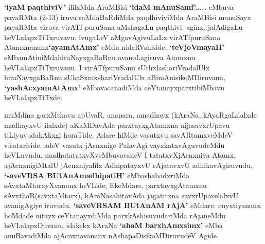 \centerline{}

\begin{artha}
\textbf{`iyaM paqthiviV'} ililxMda AraMBisi \textbf{`idaM mAnuSamf'.....} eMbuva payaRMta (2-13) iruva saMdaBaRdiMda paqdhiviyiMda AraMBisi manuSayx payaRMta viruva virATf puruSana aMshagaLu paqthivi. aginx. jalAdigaLu heVLalapxTiTxruvavu. ivugaLeV aMgavAgivuLaLx virATfpuruSana Atamxnanunx\break \textbf{`ayamAtAmx'} eMdu nideRVshiside. \textbf{`teVjoVmayaH'} eMbamAtiniMda\break hiraNayxgaBaRnu avanoLagiruva Atamxnu heVLalapxTiTxruvanu. I virATfpuruSanu sUthxlashariVradalUlx hiraNayxgaBaRnu sUkaSxmxshariVradalUlx aBimAnisikoMDiruvanu, \textbf{`yashAcxyamAtAmx'} eMbavacanadiMda ceYtanayxparxtibiMbavu heVLalapxTiTxde.
\end{artha}

\begin{artha}
 muMdina garxMthavu apUvaR, anapara, amadhayx (kAraNa, kAyaRgaLilalxde madhayxvU ilalxde) aKaMDavAda parxtayxgAtamxna nijasavxrUpavu tiLiyuvudakAkxgi horaTide, Adare hiMde vasutxvu savARtamxveMdeV visatxriside. adeV vasutx jAcnxnige PalavAgi vayxkatxvAguvudeMdu heVLuvudu, madhutatatxvXveMbuvavaneV I tatatxvXjAcnxniya Atamx, ajAcnxnigiMtalU jAcnxniyalilx AdhipatayxvU rAjatavxvU adhikavAgiruvudu, \textbf{`saveVRSA BUtAnAmadhipatiH'} eMbashabadxriMda sAvxtaMtarxyXvanunx heVLide, EkeMdare, parxtayxgAtamxnu sAvxthaR(savxtaMtarx), kAraNasahitavAda jagatitxna savxrUpavelalxvU avanigAgiye iruvudu. 
 \textbf{`saveVRSAM BUtAnAM rAjA'} eMdare. cuyxtiyanunx hoMdade nitayx ceYtanayxdiMda parxkAshisuvudariMda rAjaneMdu heVLalapxDuvanu, idakekx kAraNa \textbf{`ahaM barxhAmxsimx'} eMba anuBavadiMda ajAcnxnavanunx nAshapaDisikoMDiruvudeV Agide.
\end{artha}

